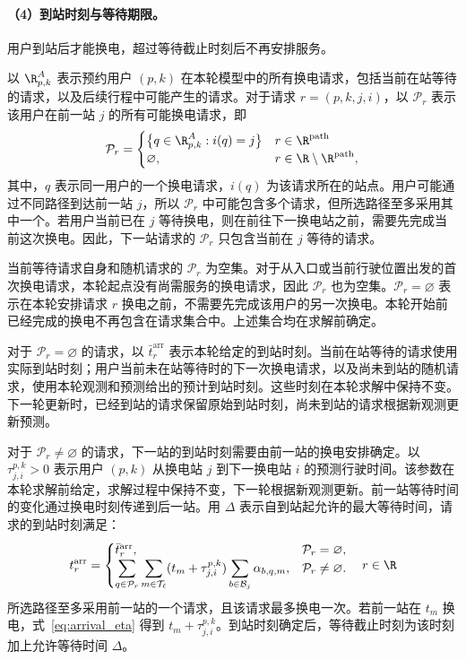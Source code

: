 \paragraph{（4）到站时刻与等待期限。}
用户到站后才能换电，超过等待截止时刻后不再安排服务。

以 $\R_{p,k}^A$ 表示预约用户 $(p,k)$ 在本轮模型中的所有换电请求，包括当前在站等待的请求，以及后续行程中可能产生的请求。对于请求 $r=(p,k,j,i)$，以 $\mathcal P_r$ 表示该用户在前一站 $j$ 的所有可能换电请求，即
\[
\mathcal P_r=
\begin{cases}
\bigl\{q\in\R_{p,k}^A:i(q)=j\bigr\}
&r\in\R^{\mathrm{path}}\\
\varnothing,&r\in\R\setminus\R^{\mathrm{path}},
\end{cases}
\]
其中，$q$ 表示同一用户的一个换电请求，$i(q)$ 为该请求所在的站点。用户可能通过不同路径到达前一站 $j$，所以 $\mathcal P_r$ 中可能包含多个请求，但所选路径至多采用其中一个。若用户当前已在 $j$ 等待换电，则在前往下一换电站之前，需要先完成当前这次换电。因此，下一站请求的 $\mathcal P_r$ 只包含当前在 $j$ 等待的请求。

当前等待请求自身和随机请求的 $\mathcal P_r$ 为空集。对于从入口或当前行驶位置出发的首次换电请求，本轮起点没有尚需服务的换电请求，因此 $\mathcal P_r$ 也为空集。$\mathcal P_r=\varnothing$ 表示在本轮安排请求 $r$ 换电之前，不需要先完成该用户的另一次换电。本轮开始前已经完成的换电不再包含在请求集合中。上述集合均在求解前确定。

对于 $\mathcal P_r=\varnothing$ 的请求，以 $\bar t_r^{\mathrm{arr}}$ 表示本轮给定的到站时刻。当前在站等待的请求使用实际到站时刻；用户当前未在站等待时的下一次换电请求，以及尚未到站的随机请求，使用本轮观测和预测给出的预计到站时刻。这些时刻在本轮求解中保持不变。下一轮更新时，已经到站的请求保留原始到站时刻，尚未到站的请求根据新观测更新预测。

对于 $\mathcal P_r\ne\varnothing$ 的请求，下一站的到站时刻需要由前一站的换电安排确定。以 $\tau_{j,i}^{p,k}>0$ 表示用户 $(p,k)$ 从换电站 $j$ 到下一换电站 $i$ 的预测行驶时间。该参数在本轮求解前给定，求解过程中保持不变，下一轮根据新观测更新。前一站等待时间的变化通过换电时刻传递到后一站。用 $\Delta$ 表示自到站起允许的最大等待时间，请求的到站时刻满足：
\begin{equation}
t_r^{\mathrm{arr}}=\begin{cases}
\bar t_r^{\mathrm{arr}},&\mathcal P_r=\varnothing,\\
\displaystyle\sum_{q\in\mathcal P_r}\sum_{m\in\mathcal T_\ell}
(t_m+\tau_{j,i}^{p,k})\sum_{b\in\mathcal B_j}\alpha_{b,q,m},
&\mathcal P_r\ne\varnothing.
\end{cases}
\quad r\in\R
\label{eq:arrival_eta}
\end{equation}
所选路径至多采用前一站的一个请求，且该请求最多换电一次。若前一站在 $t_m$ 换电，式~\eqref{eq:arrival_eta} 得到 $t_m+\tau_{j,i}^{p,k}$。到站时刻确定后，等待截止时刻为该时刻加上允许等待时间 $\Delta$。

